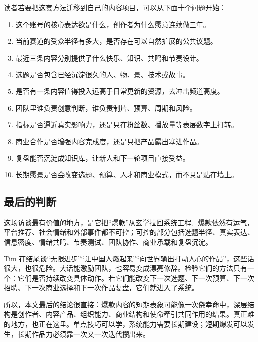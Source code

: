 \documentclass[a4paper]{article}
\begin{document}
读者若要把这套方法迁移到自己的内容项目，可以从下面十个问题开始：

\begin{enumerate}
  \item 这个账号的核心表达欲是什么，创作者为什么愿意连续做三年。
  \item 当前赛道的受众半径有多大，是否存在可以自然扩展的公共议题。
  \item 最近三条内容分别提供了什么快乐、知识、共鸣和节奏设计。
  \item 选题是否包含已经沉淀很久的人、物、景、技术或故事。
  \item 是否有一条内容值得投入远高于日常更新的资源，去冲击频道高度。
  \item 团队里谁负责创意判断，谁负责制片、预算、周期和风险。
  \item 指标是否逼近真实影响力，还是只在粉丝数、播放量等表层数字上打转。
  \item 商业合作是否增强内容完成度，还是只把产品露出塞进作品。
  \item 复盘能否沉淀成知识库，让新人和下一轮项目直接受益。
  \item 长期愿景是否会改变选题、预算、人才和商业模式，而不只是贴在墙上。
\end{enumerate}

\subsection{最后的判断}

这场访谈最有价值的地方，是它把“爆款”从玄学拉回系统工程。爆款依然有运气，平台推荐、社会情绪和外部事件都不可控；可控的部分包括选题半径、真实表达、信息密度、情绪共鸣、节奏测试、团队协作、商业承载和复盘沉淀。

Tim 在结尾谈“无限进步”“让中国人燃起来”“向世界输出打动人心的作品”，这些话很大，也很危险。大话能激励团队，也容易变成漂亮修辞。检验它们的方法只有一个：它们是否持续改变具体动作。若它们能改变下一次选题、下一次预算、下一次招聘、下一次商业选择和下一次作品复盘，它们就进入了系统。

所以，本文最后的结论很直接：爆款内容的短期表象可能像一次侥幸命中，深层结构是创作者、内容产品、组织能力、商业结构和使命牵引共同作用的结果。真正难的地方，也正在这里。单点技巧可以学，系统能力需要长期建设；短期爆发可以发生，长期作品力必须靠一次又一次迭代攒出来。
\end{document}
